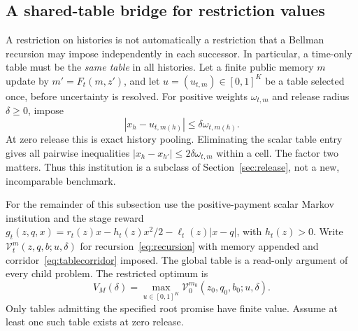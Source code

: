 \subsection{A shared-table bridge for restriction values}\label{sec:bridge}
A restriction on histories is not automatically a restriction that a Bellman recursion may impose independently in each successor. In particular, a time-only table must be the \emph{same table} in all histories. Let a finite public memory $m$ update by $m'=F_t(m,z')$, and let $u=(u_{t,m})\in[0,1]^K$ be a table selected once, before uncertainty is resolved. For positive weights $\omega_{t,m}$ and release radius $\delta\geq0$, impose
\begin{equation}\label{eq:tablecorridor}
 |x_h-u_{t,m(h)}|\leq\delta\omega_{t,m(h)}.
\end{equation}
At zero release this is exact history pooling. Eliminating the scalar table entry gives all pairwise inequalities $|x_h-x_{h'}|\leq2\delta\omega_{t,m}$ within a cell. The factor two matters. Thus this institution is a subclass of Section~\ref{sec:release}, not a new, incomparable benchmark.

For the remainder of this subsection use the positive-payment scalar Markov institution and the stage reward $g_t(z,q,x)=r_t(z)x-h_t(z)x^2/2-\ell_t(z)|x-q|$, with $h_t(z)>0$. Write $\mathcal V^m_t(z,q,b;u,\delta)$ for recursion~\eqref{eq:recursion} with memory appended and corridor~\eqref{eq:tablecorridor} imposed. The global table is a read-only argument of every child problem. The restricted optimum is
\begin{equation}\label{eq:tablevalue}
 V_M(\delta)=\max_{u\in[0,1]^K}\mathcal V^{m_0}_0(z_0,q_0,b_0;u,\delta).
\end{equation}
Only tables admitting the specified root promise have finite value. Assume at least one such table exists at zero release.

